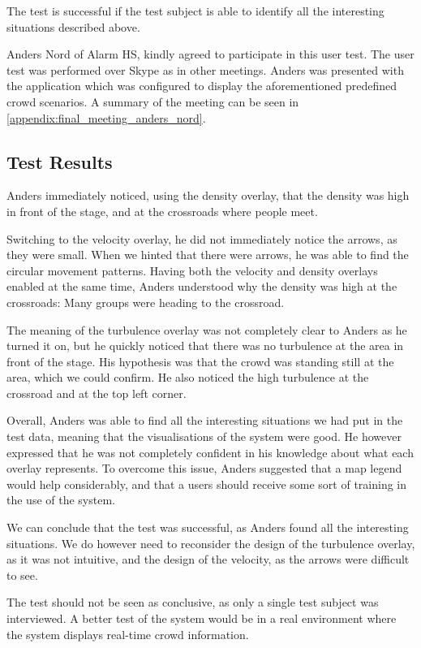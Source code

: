 The test is successful if the test subject is able to identify all the interesting situations described above. 

Anders Nord of Alarm HS, kindly agreed to participate in this user test. The user test was performed over Skype as in other meetings. Anders was presented with the application which was configured to display the aforementioned predefined crowd scenarios. A summary of the meeting can be seen in \cref{appendix:final_meeting_anders_nord}.

\subsection{Test Results}
Anders immediately noticed, using the density overlay, that the density was high in front of the stage, and at the crossroads where people meet. 

Switching to the velocity overlay, he did not immediately notice the arrows, as they were small. When we hinted that there were arrows, he was able to find the circular movement patterns. Having both the velocity and density overlays enabled at the same time, Anders understood why the density was high at the crossroads: Many groups were heading to the crossroad.

The meaning of the turbulence overlay was not completely clear to Anders as he turned it on, but he quickly noticed that there was no turbulence at the area in front of the stage. His hypothesis was that the crowd was standing still at the area, which we could confirm. He also noticed the high turbulence at the crossroad and at the top left corner.

Overall, Anders was able to find all the interesting situations we had put in the test data, meaning that the visualisations of the system were good. He however expressed that he was not completely confident in his knowledge about what each overlay represents. To overcome this issue, Anders suggested that a map legend would help considerably, and that a users should receive some sort of training in the use of the system. 

We can conclude that the test was successful, as Anders found all the interesting situations. We do however need to reconsider the design of the turbulence overlay, as it was not intuitive, and the design of the velocity, as the arrows were difficult to see.

The test should not be seen as conclusive, as only a single test subject was interviewed. A better test of the system would be in a real environment where the system displays real-time crowd information.
